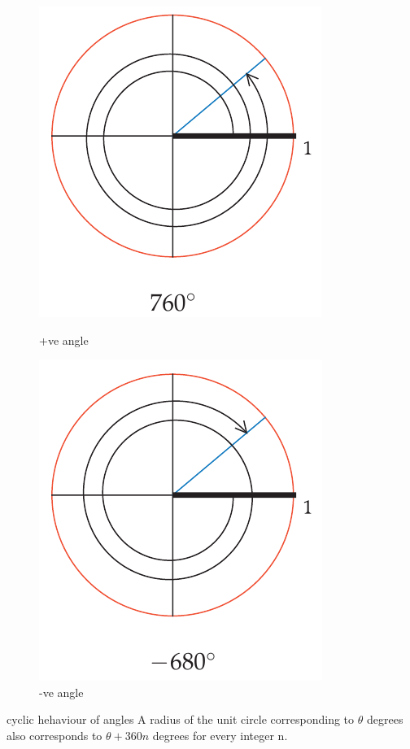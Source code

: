 \documentclass{beamer}
\begin{document}
    \begin{frame}
        \begin{figure}[h]    
            \begin{minipage}[b]{0.3\textwidth}
            \centering
            \includegraphics[scale=0.25]{3.png}
            \caption{+ve angle}
        \end{minipage}
        \begin{minipage}[b]{0.3\textwidth}
            \centering
            \includegraphics[scale=0.25]{4.png}
            \caption{-ve angle}
        \end{minipage}
    \end{figure}
    \begin{block}{cyclic hehaviour of angles}
        A radius of the unit circle corresponding to $\theta$ degrees also corresponds to
    $\theta + 360n$ degrees for every integer n.
    \end{block}
    \end{frame}
    
\end{document}
